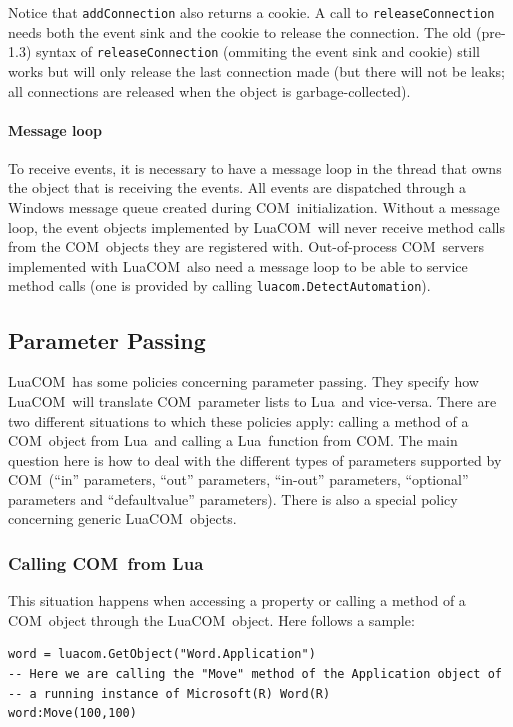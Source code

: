\documentclass[11pt,a4paper,english]{report}
\newcommand{\techname}[1]{\mbox{#1}}
\newcommand{\lua}{\techname{Lua}}
\newcommand{\com}{\techname{COM}}
\newcommand{\luacom}{\techname{LuaCOM}}
\begin{document}
Notice that \verb+addConnection+ also returns a cookie. A call to
\verb+releaseConnection+ needs both the event sink and the cookie to release the
connection. The old (pre-1.3) syntax of \verb+releaseConnection+ (ommiting the event sink
and cookie) still works but will only release the last connection made (but there will
not be leaks; all connections are released when the object is garbage-collected).

\paragraph{Message loop}
To receive events, it is necessary to have a message loop in the thread
that owns the object that is receiving the events. All events are dispatched
through a Windows message queue created
during \com\ initialization. Without a message loop, the event objects
implemented by \luacom\ will never
receive method calls from the \com\ objects they are registered with. Out-of-process
\com\ servers implemented with \luacom\ also need a message loop to be able to service
method calls (one is provided by calling \verb+luacom.DetectAutomation+).


\subsection{Parameter Passing}

  \luacom\ has some policies concerning parameter passing. They
  specify how \luacom\ will translate \com\ parameter lists to \lua\
  and vice-versa. There are two different situations to which these
  policies apply: calling a method of a \com\ object from \lua\ and
  calling a \lua\ function from \com. The main question here is how to
  deal with the different types of parameters supported by \com\
  (``in'' parameters, ``out'' parameters, ``in-out'' parameters,
  ``optional'' parameters and ``defaultvalue'' parameters). There is
  also a special policy concerning generic \luacom\ objects.

\subsubsection{Calling \com\ from \lua}

  This situation happens when accessing a property or calling a method
  of a \com\ object through the \luacom\ object. Here follows a
  sample:

\begin{verbatim}
word = luacom.GetObject("Word.Application")
-- Here we are calling the "Move" method of the Application object of
-- a running instance of Microsoft(R) Word(R)
word:Move(100,100)
\end{verbatim}
\end{document}
